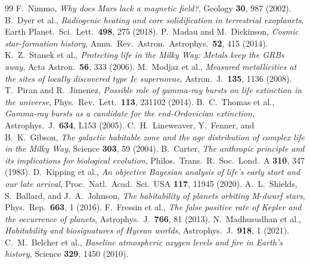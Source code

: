 \documentclass[11pt,a4paper]{article}
\begin{document}
\begin{thebibliography}{99}
 F.~Nimmo, \emph{Why does Mars lack a magnetic field?}, Geology \textbf{30}, 987 (2002).
 B.~Dyer et al., \emph{Radiogenic heating and core solidification in terrestrial exoplanets}, Earth Planet.\ Sci.\ Lett.\ \textbf{498}, 275 (2018).
 P.~Madau and M.~Dickinson, \emph{Cosmic star-formation history}, Annu.\ Rev.\ Astron.\ Astrophys.\ \textbf{52}, 415 (2014).
 K.~Z.~Stanek et al., \emph{Protecting life in the Milky Way: Metals keep the GRBs away}, Acta Astron.\ \textbf{56}, 333 (2006).
 M.~Modjaz et al., \emph{Measured metallicities at the sites of locally discovered type Ic supernovae}, Astron.\ J.\ \textbf{135}, 1136 (2008).
 T.~Piran and R.~Jimenez, \emph{Possible role of gamma-ray bursts on life extinction in the universe}, Phys.\ Rev.\ Lett.\ \textbf{113}, 231102 (2014).
 B.~C.~Thomas et al., \emph{Gamma-ray bursts as a candidate for the end-Ordovician extinction}, Astrophys.\ J.\ \textbf{634}, L153 (2005).
 C.~H.~Lineweaver, Y.~Fenner, and B.~K.~Gibson, \emph{The galactic habitable zone and the age distribution of complex life in the Milky Way}, Science \textbf{303}, 59 (2004).
 B.~Carter, \emph{The anthropic principle and its implications for biological evolution}, Philos.\ Trans.\ R.\ Soc.\ Lond.\ A \textbf{310}, 347 (1983).
 D.~Kipping et al., \emph{An objective Bayesian analysis of life's early start and our late arrival}, Proc.\ Natl.\ Acad.\ Sci.\ USA \textbf{117}, 11945 (2020).
 A.~L.~Shields, S.~Ballard, and J.~A.~Johnson, \emph{The habitability of planets orbiting M-dwarf stars}, Phys.\ Rep.\ \textbf{663}, 1 (2016).
 F.~Fressin et al., \emph{The false positive rate of Kepler and the occurrence of planets}, Astrophys.\ J.\ \textbf{766}, 81 (2013).
 N.~Madhusudhan et al., \emph{Habitability and biosignatures of Hycean worlds}, Astrophys.\ J.\ \textbf{918}, 1 (2021).
 C.~M.~Belcher et al., \emph{Baseline atmospheric oxygen levels and fire in Earth's history}, Science \textbf{329}, 1450 (2010).

\end{thebibliography}
\end{document}
